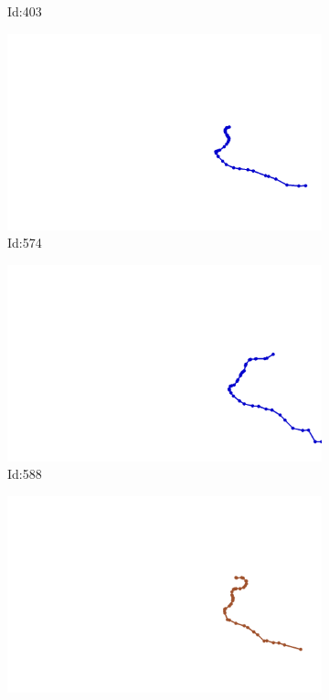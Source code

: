 \documentclass[12pt,twoside]{report}
\begin{document}
\begin{figure}
\begin{subfigure}[b]{0.20\textwidth}
\caption{Id:403}
\end{subfigure}
\begin{subfigure}[b]{0.20\textwidth}
\centering
\includegraphics[width=\textwidth]{../../trajectories/574.png}
\caption{Id:574}
\end{subfigure}
\begin{subfigure}[b]{0.20\textwidth}
\centering
\includegraphics[width=\textwidth]{../../trajectories/588.png}
\caption{Id:588}
\end{subfigure}
\begin{subfigure}[b]{0.20\textwidth}
\centering
\includegraphics[width=\textwidth]{../../trajectories/831.png}

\end{subfigure}
\end{figure}
\end{document}
